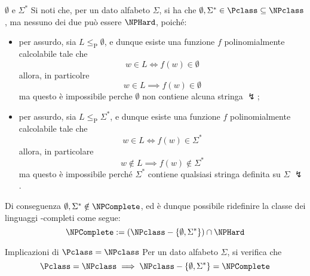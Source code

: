 \documentclass[a4paper, 12pt]{report}
\begin{document}
    \begin{framedobs}[label={emptyset e sigma star}, breakable]{$\emptyset$ e $\Sigma^*$}
        Si noti che, per un dato alfabeto $\Sigma$, si ha che $\emptyset, \Sigma^* \in \Pclass \subseteq \NPclass$, ma nessuno dei due può essere $\NPHard$, poiché:

        \begin{itemize}
            \item per assurdo, sia $L \leq_\mathrm P \emptyset$, e dunque esiste una funzione $f$ polinomialmente calcolabile tale che $$w \in L \iff f(w) \in \emptyset$$ allora, in particolre $$w \in L \implies f(w) \in \emptyset$$ ma questo è impossibile perche $\emptyset$ non contiene alcuna stringa $\lightning$;
            \item per assurdo, sia $L \leq_\mathrm P \Sigma^*$, e dunque esiste una funzione $f$ polinomialmente calcolabile tale che $$w \in L \iff f(w) \in \Sigma^*$$ allora, in particolare $$w \notin L \implies f(w) \notin \Sigma^*$$ ma questo è impossibile perché $\Sigma^*$ contiene qualsiasi stringa definita su $\Sigma$ $\lightning$.
        \end{itemize}

        Di conseguenza $\emptyset, \Sigma^* \notin \NPComplete$, ed è dunque possibile ridefinire la classe dei linguaggi \NPclass-completi come segue: $$\NPComplete := (\NPclass - \{\emptyset, \Sigma^*\}) \cap \NPHard$$
    \end{framedobs}

    \begin{framedthm}[label={p = np impl 5}]{Implicazioni di $\Pclass = \NPclass$}
        Per un dato alfabeto $\Sigma$, si verifica che $$\Pclass = \NPclass \implies \NPclass - \{\emptyset, \Sigma^*\} = \NPComplete$$
    \end{framedthm}
\end{document}
